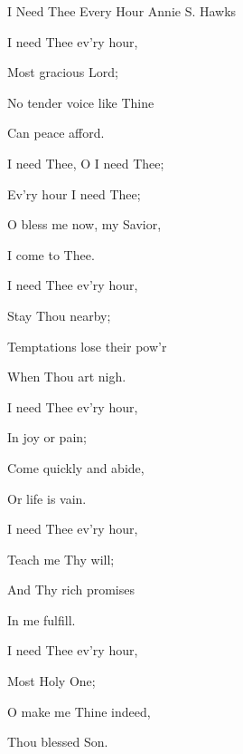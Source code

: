 \documentclass[12pt]{book}
\begin{document}
\begin{song}{I Need Thee Every Hour}{}
  {\SBPubDom}
  {Annie S. Hawks}
  {}
  {}

  \begin{SBVerse}
    I need Thee ev'ry hour,

    Most gracious Lord;

    No tender voice like Thine

    Can peace afford.
  \end{SBVerse}

  \begin{SBOpGroup}
    I need Thee, O I need Thee;

    Ev'ry hour I need Thee;

    O bless me now, my Savior,

    I come to Thee.
  \end{SBOpGroup}

  \begin{SBVerse}
    I need Thee ev'ry hour,

    Stay Thou nearby;

    Temptations lose their pow'r

    When Thou art nigh.
  \end{SBVerse}

  \begin{SBVerse}
    I need Thee ev'ry hour,

    In joy or pain;

    Come quickly and abide,

    Or life is vain.
  \end{SBVerse}

  \begin{SBVerse}
    I need Thee ev'ry hour,

    Teach me Thy will;

    And Thy rich promises

    In me fulfill.
  \end{SBVerse}

  \begin{SBVerse}
    I need Thee ev'ry hour,

    Most Holy One;

    O make me Thine indeed,

    Thou blessed Son.
  \end{SBVerse}
\end{song}
\end{document}
